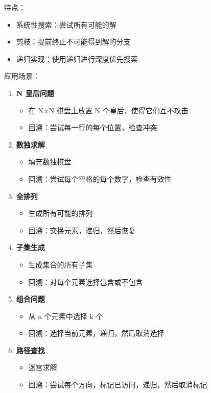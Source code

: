 特点：
\begin{itemize}
  \item 系统性搜索：尝试所有可能的解
  \item 剪枝：提前终止不可能得到解的分支
  \item 递归实现：使用递归进行深度优先搜索
\end{itemize}

应用场景：
\begin{enumerate}
  \item \textbf{N 皇后问题}
    \begin{itemize}
      \item 在 N×N 棋盘上放置 N 个皇后，使得它们互不攻击
      \item 回溯：尝试每一行的每个位置，检查冲突
    \end{itemize}

  \item \textbf{数独求解}
    \begin{itemize}
      \item 填充数独棋盘
      \item 回溯：尝试每个空格的每个数字，检查有效性
    \end{itemize}

  \item \textbf{全排列}
    \begin{itemize}
      \item 生成所有可能的排列
      \item 回溯：交换元素，递归，然后恢复
    \end{itemize}

  \item \textbf{子集生成}
    \begin{itemize}
      \item 生成集合的所有子集
      \item 回溯：对每个元素选择包含或不包含
    \end{itemize}

  \item \textbf{组合问题}
    \begin{itemize}
      \item 从 n 个元素中选择 k 个
      \item 回溯：选择当前元素，递归，然后取消选择
    \end{itemize}

  \item \textbf{路径查找}
    \begin{itemize}
      \item 迷宫求解
      \item 回溯：尝试每个方向，标记已访问，递归，然后取消标记
    \end{itemize}
\end{enumerate}

